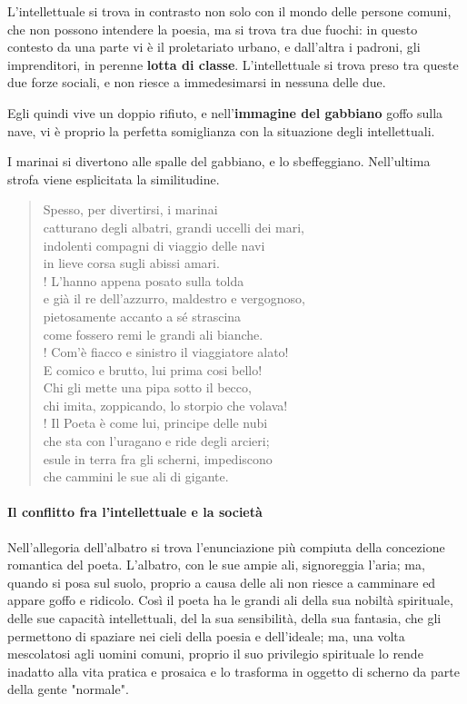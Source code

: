 \documentclass{book}
\newcommand{\evidenziatore}[1]{\textbf{#1}}
\newcounter{mar}
\begin{document}
L'intellettuale si trova in contrasto non solo con il mondo delle
persone comuni, che non possono intendere la poesia, ma si trova tra due
fuochi: in questo contesto da una parte vi è il proletariato urbano, e
dall'altra i padroni, gli imprenditori, in perenne
\evidenziatore{lotta di classe}. L'intellettuale si trova preso tra
queste due forze sociali, e non riesce a immedesimarsi in nessuna delle
due.

Egli quindi vive un doppio rifiuto, e
nell'\evidenziatore{immagine del gabbiano} goffo sulla nave, vi è
proprio la perfetta somiglianza con la situazione degli intellettuali.

I marinai si divertono alle spalle del gabbiano, e lo sbeffeggiano.
Nell'ultima strofa viene esplicitata la similitudine.

\begin{verse}
Spesso, per divertirsi, i marinai \\
catturano degli albatri, grandi uccelli dei mari, \\
indolenti compagni di viaggio delle navi  \\
in lieve corsa sugli abissi amari.  \\!
L’hanno appena posato sulla tolda \\
e già il re dell’azzurro, maldestro e vergognoso, \\
pietosamente accanto a sé strascina \\
come fossero remi le grandi ali bianche.  \\!
Com’è fiacco e sinistro il viaggiatore alato! \\
E comico e brutto, lui prima cosi bello!  \\
Chi gli mette una pipa sotto il becco,  \\
chi imita, zoppicando, lo storpio che volava! \\!
Il Poeta è come lui, principe delle nubi  \\
che sta con l’uragano e ride degli arcieri; \\
esule in terra fra gli scherni, impediscono \\
che cammini le sue ali di gigante.
\end{verse}


\paragraph{Il conflitto fra l'intellettuale e la società} Nell'allegoria dell'albatro si trova l'enunciazione più compiuta della concezione romantica del poeta. L'albatro, con le sue ampie ali, signoreggia l'aria; ma, quando si posa sul suolo, proprio a causa delle ali non riesce a camminare ed appare goffo e ridicolo. Così il poeta ha le grandi ali della sua nobiltà spirituale, delle sue capacità intellettuali, del la sua sensibilità, della sua fantasia, che gli permettono di spaziare nei cieli della poesia e dell'ideale; ma, una volta mescolatosi agli uomini comuni, proprio il suo privilegio spirituale lo rende inadatto alla vita pratica e prosaica e lo trasforma in oggetto di scherno da parte della gente "normale".
\end{document}
